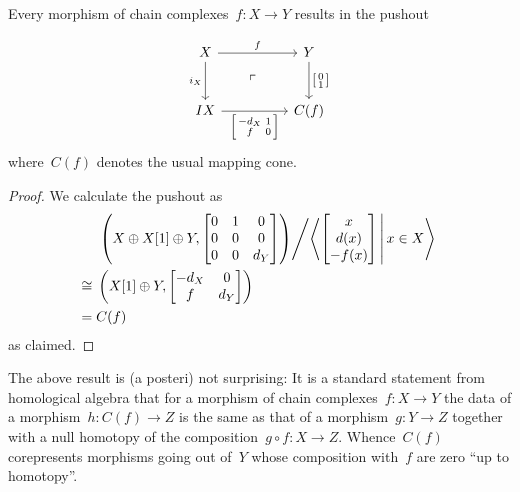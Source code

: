 \documentclass[a4paper,10pt]{scrartcl}
\begin{document}
\begin{lemma}
  Every morphism of chain complexes~$f \colon X \to Y$ results in the pushout

  \[
    \begin{tikzcd}[ampersand replacement = \&, row sep = large, column sep = huge]
      X
      \arrow{r}[above]{f}
      \arrow{d}[left]{i_X}
      \arrow[phantom]{dr}{\ulcorner}
      \&
      Y
      \arrow{d}[right]{\begin{bsmallmatrix} 0 \\ 1 \end{bsmallmatrix}}
      \\
      IX
      \arrow{r}[below]{\begin{bsmallmatrix} -d_X & 1 \\ f & 0 \end{bsmallmatrix}}
      \&
      C(f)
    \end{tikzcd}
  \]
  where~$C(f)$ denotes the usual mapping cone.
\end{lemma}

\begin{proof}
  We calculate the pushout as
  \begin{align*}
    {}&
    \left.
    \left(
      X \oplus X[1] \oplus Y,
      \begin{bmatrix}
        0 & 1 & 0   \\
        0 & 0 & 0   \\
        0 & 0 & d_Y
      \end{bmatrix}
    \right)
    \middle/
    \gen*{
      \begin{bmatrix}
           x  \\
         d(x) \\
        -f(x)
      \end{bmatrix}
    \suchthat*
      x \in X
    }
    \right.
    \\
    \cong{}&
    \left(
      X[1] \oplus Y,
      \begin{bmatrix}
        -d_X & 0   \\
         f   & d_Y
      \end{bmatrix}
    \right)
    \\
    ={}&
    C(f)
  \end{align*}
  as claimed.
\end{proof}

\begin{remark}
  The above result is (a posteri) not surprising:
  It is a standard statement from homological algebra that for a morphism of chain complexes~$f \colon X \to Y$ the data of a morphism~$h \colon C(f) \to Z$ is the same as that of a morphism~$g \colon Y \to Z$ together with a null homotopy of the composition~$g \circ f \colon X \to Z$.
  Whence~$C(f)$ corepresents morphisms going out of~$Y$ whose composition with~$f$ are zero \enquote{up to homotopy}.
\end{remark}
\end{document}
